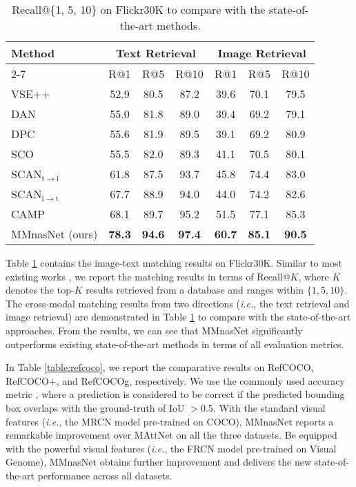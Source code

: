 \documentclass[sigconf]{acmart}
\begin{document}
\setcounter{table}{3}
\begin{table}
\centering
\small
\caption{Recall@\{1, 5, 10\} on Flickr30K to compare with the state-of-the-art methods.}
\label{table:flickr30k}
\begin{tabular}{l|ccc|ccc}
\toprule
\multirow{3}{*}{Method} & \multicolumn{3}{c|}{Text Retrieval} &\multicolumn{3}{c}{Image Retrieval} \\
\cmidrule{2-7}
 & R@1 &  R@5 &  R@10 & R@1 &  R@5 &  R@10 \\
\midrule
VSE++ \cite{faghri2017vse} & 52.9 &80.5 &87.2 & 39.6 &70.1 &79.5 \\
DAN \cite{nam2017dual} & 55.0 &81.8& 89.0 &39.4& 69.2& 79.1\\
DPC \cite{zheng2017dual} & 55.6 &81.9& 89.5 &39.1 &69.2 &80.9\\
SCO \cite{huang2018learning} &55.5 &82.0& 89.3 &41.1& 70.5& 80.1\\
SCAN$_\mathrm{t\rightarrow i}$ \cite{lee2018stacked} & 61.8& 87.5& 93.7& 45.8 &74.4& 83.0\\
SCAN$_\mathrm{i\rightarrow t}$ \cite{lee2018stacked} & 67.7 &88.9& 94.0& 44.0& 74.2 &82.6\\
CAMP \cite{wang2019camp} & 68.1 &89.7& 95.2& 51.5& 77.1& 85.3\\
\midrule
MMnasNet (ours)& \textbf{78.3} & \textbf{94.6} & \textbf{97.4} & \textbf{60.7} & \textbf{85.1} & \textbf{90.5} \\
\bottomrule
\end{tabular}
\end{table}

Table \ref{table:flickr30k} contains the image-text matching results on Flickr30K. Similar to most existing works \cite{lee2018stacked, wang2019camp}, we report the matching results in terms of Recall@$K$, where $K$ denotes the top-$K$ results retrieved from a database and ranges within $\{1,5,10\}$.  The cross-modal matching results from two directions (\emph{i.e.}, the text retrieval and image retrieval) are demonstrated in Table \ref{table:flickr30k} to compare with the state-of-the-art approaches. From the results, we can see that MMnasNet significantly outperforms existing state-of-the-art methods in terms of all evaluation metrics.

In Table \ref{table:refcoco}, we report the comparative results on RefCOCO, RefCOCO+, and RefCOCOg, respectively. We use the commonly used accuracy metric \cite{yu2018mattnet}, where a prediction is considered to be correct if the predicted bounding box overlaps with the ground-truth of IoU $>$0.5. With the standard visual features (\emph{i.e.}, the MRCN model pre-trained on COCO), MMnasNet reports a remarkable improvement over MAttNet on all the three datasets. Be equipped with the powerful visual features (\emph{i.e.}, the FRCN model pre-trained on Visual Genome), MMnasNet obtains further improvement and delivers the new state-of-the-art performance across all datasets.
\end{document}
